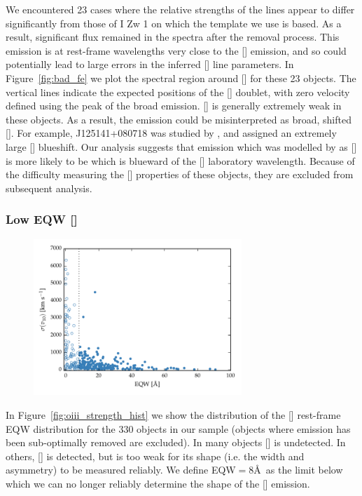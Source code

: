 We encountered 23 cases where the relative strengths of the  lines appear to differ significantly from those of I Zw 1 on which the  template we use is based. 
As a result, significant  flux remained in the spectra after the removal process. 
This emission is at rest-frame wavelengths very close to the [] emission, and so could potentially lead to large errors in the inferred [] line parameters. 
In Figure~\ref{fig:bad_fe} we plot the spectral region around [] for these 23 objects.
The vertical lines indicate the expected positions of the [] doublet, with zero velocity defined using the peak of the broad \hb emission. 
[] is generally extremely weak in these objects. 
As a result, the  emission could be misinterpreted as broad, shifted []. 
For example, J125141+080718 was studied by \citet{shen16a}, and assigned an extremely large [] blueshift. 
Our analysis suggests that emission which was modelled by \citet{shen16a} as [] is more likely to be  which is blueward of the [] laboratory wavelength. 
Because of the difficulty measuring the [] properties of these objects, they are excluded from subsequent analysis.  

\subsubsection{Low \ac{EQW} []}

\begin{figure}
    \centering
    \includegraphics[width=0.7\textwidth]{figures/chapter04/eqw_cut.pdf} 
    \caption{}     
    \label{fig:eqw_cut}
\end{figure}


In Figure~\ref{fig:oiii_strength_hist} we show the distribution of the [] rest-frame \ac{EQW} distribution for the 330 objects in our sample (objects where  emission has been sub-optimally removed are excluded). 
In many objects [] is undetected. 
In others, [] is detected, but is too weak for its shape (i.e. the width and asymmetry) to be measured reliably. 
We define \ac{EQW}$=8$\AA\, as the limit below which we can no longer reliably determine the shape of the [] emission. 

